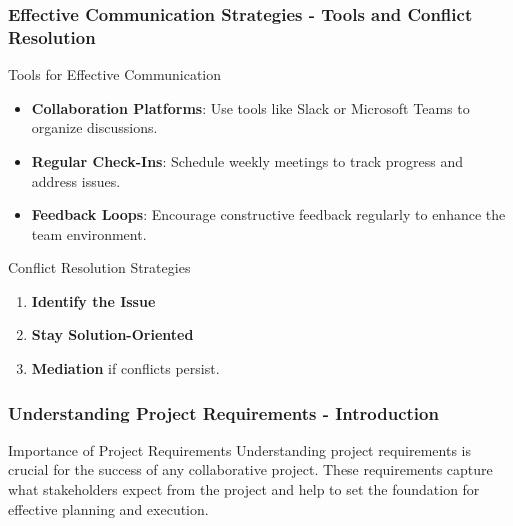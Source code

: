 \documentclass[aspectratio=169]{beamer}
\begin{document}
\begin{frame}[fragile]
    \frametitle{Effective Communication Strategies - Tools and Conflict Resolution}
    \begin{block}{Tools for Effective Communication}
        \begin{itemize}
            \item \textbf{Collaboration Platforms}: Use tools like Slack or Microsoft Teams to organize discussions.
            \item \textbf{Regular Check-Ins}: Schedule weekly meetings to track progress and address issues.
            \item \textbf{Feedback Loops}: Encourage constructive feedback regularly to enhance the team environment.
        \end{itemize}
    \end{block}
    
    \begin{block}{Conflict Resolution Strategies}
        \begin{enumerate}
            \item \textbf{Identify the Issue}
            \item \textbf{Stay Solution-Oriented}
            \item \textbf{Mediation} if conflicts persist.
        \end{enumerate}
    \end{block}
\end{frame}

\begin{frame}[fragile]
    \frametitle{Understanding Project Requirements - Introduction}
    \begin{block}{Importance of Project Requirements}
        Understanding project requirements is crucial for the success of any collaborative project. These requirements capture what stakeholders expect from the project and help to set the foundation for effective planning and execution.
    \end{block}
\end{frame}
\end{document}
